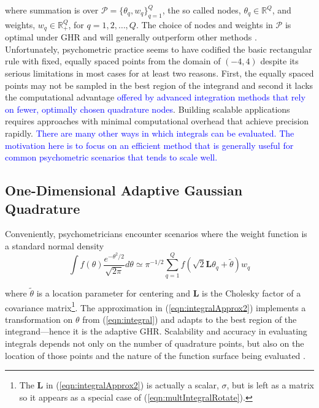 \documentclass[12pt]{article}
\begin{document}
\noindent where summation is over $\mathcal{P}=\{\theta_q,w_q\}^Q_{q=1}$, the so called nodes, $\theta_q \in \mathbb{R}^Q$, and weights, $w_q \in \mathbb{R}_+^Q$, for $q = 1,2, \ldots, Q$. The choice of nodes and weights in $\mathcal{P}$ is optimal under GHR and will generally outperform other methods \cite{Quarteroni}. Unfortunately, psychometric practice seems to have codified the basic rectangular rule with fixed, equally spaced points from the domain of $(-4,4)$ \cite{bock:eap,DeMars2005} despite its serious limitations in most cases for at least two reasons. First, the equally spaced points may not be sampled in the best region of the integrand and second it lacks the computational advantage \textcolor{blue}{offered by advanced integration methods that rely on fewer, optimally chosen quadrature nodes}. Building scalable applications requires approaches with minimal computational overhead that achieve precision rapidly. \textcolor{blue}{There are many other ways in which integrals can be evaluated. The motivation here is to focus on an efficient method that is generally useful for common psychometric scenarios that tends to scale well.}

\subsection*{One-Dimensional Adaptive Gaussian Quadrature}

Conveniently, psychometricians encounter scenarios where the weight function is a standard normal density
\begin{equation}
\label{eqn:integralApprox2}
\int f(\theta)\frac{e^{-\theta^2/2}}{\sqrt{2\pi}} d\theta \simeq \pi^{-1/2}\sum_{q=1}^Q f(\sqrt{2}\bm{L}\theta_q+\widetilde{\theta})w_q
\end{equation}

\noindent where $\widetilde{\theta}$ is a location parameter for centering \cite{liu:pierce} and $\bm{L}$ is the Cholesky factor of a covariance matrix\footnote{The $\bm{L}$ in (\ref{eqn:integralApprox2}) is actually a scalar, $\sigma$, but is left as a matrix so it appears as a special case of (\ref{eqn:multIntegralRotate}).}. The approximation in (\ref{eqn:integralApprox2}) implements a transformation on $\theta$ from (\ref{eqn:integral}) and adapts to the best region of the integrand---hence it is the adaptive GHR. Scalability and accuracy in evaluating integrals depends not only on the number of quadrature points, but also on the location of those points and the nature of the function surface being evaluated \cite{Lesaffre}. 
\end{document}
